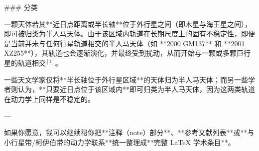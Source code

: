 ### 分类

一颗天体若其**近日点距离或半长轴**位于外行星之间（即木星与海王星之间），即可被归类为半人马天体。由于该区域内轨道在长期尺度上的固有不稳定性，即便是当前并未与任何行星轨道相交的半人马天体（如 **2000 GM137** 和 **2001 XZ255**），其轨道也会逐渐演化，并最终受到扰动，从而开始与一颗或多颗巨行星的轨道相交$^{[1]}$。

一些天文学家仅将**半长轴位于外行星区域**的天体归为半人马天体；而另一些学者则认为，**只要近日点位于该区域内**即可归类为半人马天体，因为这两类轨道在动力学上同样是不稳定的。

---

如果你愿意，我可以继续帮你把**注释（note）部分**、**参考文献列表**或**与小行星带/柯伊伯带的动力学联系**统一整理成**完整 LaTeX 学术条目**。
